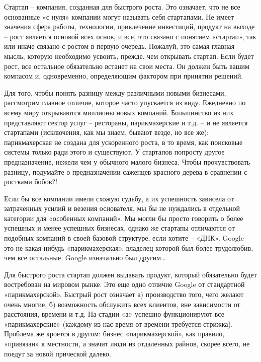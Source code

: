 \documentclass[ebook,12pt,oneside,openany]{memoir}
\begin{document}
\maketitle

Стартап – компания, созданная для быстрого роста. Это означает, что не
все основанные «с нуля» компании могут называть себя стартапами. Не
имеет значения сфера работы, технологии, привлечение инвестиций,
продукт на выходе – рост является основой всех основ, и все, что
связано с понятием «стартап», так или иначе связано с ростом в первую
очередь. Пожалуй, это самая главная мысль, которую необходимо усвоить,
прежде, чем открывать стартап. Если будет рост, все остальное
обязательно встанет на свои места. Он должен быть вашим компасом и,
одновременно, определяющим фактором при принятии решений.

Для того, чтобы понять разницу между различными новыми бизнесами,
рассмотрим главное отличие, которое часто упускается из виду.
Ежедневно по всему миру открываются миллионы новых компаний.
Большинство из них представляют сектор услуг – рестораны,
парикмахерские и т.д. – и не является стартапами (исключения, как мы
знаем, бывают везде, но все же): парикмахерская не создана для
ускоренного роста, в то время, как поисковые системы только ради этого
и существуют. У стартапов попросту другое предназначение, нежели чем у
обычного малого бизнеса. Чтобы прочувствовать разницу, подумайте о
предназначении саженцев красного дерева в сравнении с ростками бобов?!

Если бы все компании имели схожую судьбу, а их успешность зависела от
затраченных усилий и везения основателя, мы бы не нуждались в
отдельной категории для «особенных компаний». Мы могли бы просто
говорить о более успешных и менее успешных бизнесах, однако же
стартапы отличаются от подобных компаний в своей базовой структуре,
если хотите – «ДНК». Google – это не какая-нибудь «парикмахерская»,
владелец которой был более трудолюбив, чем все остальные. Google
изначально был другим…

Для быстрого роста стартап должен выдавать продукт, который
обязательно будет востребован на мировом рынке. Это еще одно отличие
Google от стандартной «парикмахерской». Быстрый рост означает а)
производство того, чего желают очень многие, б) возможность обслужить
всех клиентов, вне зависимости от расстояния, времени и т.д. На стадии
«а» успешно функционируют все «парикмахерские» (каждому из нас время
от времени требуется стрижка). Проблема же кроется в другом: бизнес
«парикмахерской», как правило, «привязан» к местности, а значит люди
из отдаленных райнов, скорее всего, не поедут за новой прической
далеко.
\end{document}
